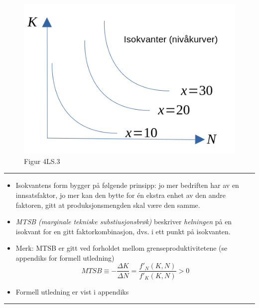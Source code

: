 \documentclass[
  letterpaper,
  DIV=11,
  numbers=noendperiod]{scrartcl}
\providecommand{\tightlist}{%
  \setlength{\itemsep}{0pt}\setlength{\parskip}{0pt}}\usepackage{longtable,booktabs,array}
\begin{document}
\begin{figure}[H]

{\centering \includegraphics[width=1\textwidth,height=\textheight]{drawio/isokvant.png}

}

\caption{Figur 4LS.3}

\end{figure}%

\begin{center}\rule{0.5\linewidth}{0.5pt}\end{center}

\begin{itemize}
\tightlist
\item
  Isokvantens form bygger på følgende prinsipp: jo mer bedriften har av
  en innsatsfaktor, jo mer kan den bytte for én ekstra enhet av den
  andre faktoren, gitt at produksjonsmengden skal være den samme.
\item
  \emph{MTSB (marginale tekniske substiusjonsbrøk)} beskriver
  \emph{helningen} på en isokvant for en gitt faktorkombinasjon, dvs. i
  ett punkt på isokvanten.
\item
  Merk: MTSB er gitt ved forholdet mellom grenseproduktivitetene (se
  appendiks for formell utledning) \begin{equation*}
  MTSB \equiv -\frac{\Delta K}{\Delta N} =  \frac{f'_{N}(K,N)}{f'_{K}(K,N)}>0
  \end{equation*}
\item
  Formell utledning er vist i appendiks
\end{itemize}

\begin{center}\rule{0.5\linewidth}{0.5pt}\end{center}
\end{document}

